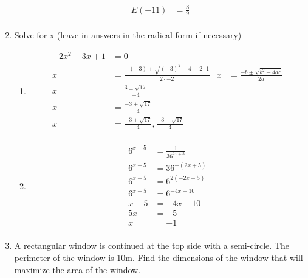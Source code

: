 \documentclass[paper=a4, fontsize=11pt]{scrartcl}
\begin{document}
\begin{enumerate}
\begin{align*}
        E(-11)&=\frac{8}{9}\\
    \end{align*}
    \item Solve for x (leave in answers in the radical form if necessary)
    \begin{enumerate}
        \item \begin{align*}
            -2x^2-3x+1&=0\\
            x&=\frac{-(-3)\pm\sqrt{(-3)^2-4\cdot -2\cdot 1}}{2\cdot -2}&x&=\frac{-b\pm\sqrt{b^2-4ac}}{2a}\\
            x&=\frac{3\pm\sqrt{17}}{-4}\\
            x&=\frac{-3\pm\sqrt{17}}{4}\\
            x&=\frac{-3+\sqrt{17}}{4},\frac{-3-\sqrt{17}}{4}\\
        \end{align*}
        \item \begin{align*}
            6^{x-5}&=\frac{1}{36^{2x+5}}\\
            6^{x-5}&=36^{-(2x+5)}\\
            6^{x-5}&=6^{2(-2x-5)}\\
            6^{x-5}&=6^{-4x-10}\\
            x-5&=-4x-10\\
            5x&=-5\\
            x&=-1\\
        \end{align*}
    \end{enumerate}
    \item A rectangular window is continued at the top side with a semi-circle. The perimeter of the window is 10m. Find the dimensions of the window that will maximize the area of the window.
\end{enumerate}
\end{document}
